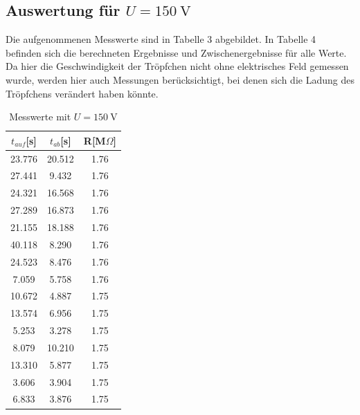 \documentclass[11pt,ngerman,a4paper]{article}
\begin{document}
\subsection{Auswertung für $U=\SI{150}{\volt}$}
Die aufgenommenen Messwerte sind in Tabelle 3 abgebildet. In Tabelle 4 befinden sich die berechneten Ergebnisse und Zwischenergebnisse für alle Werte. Da hier die Geschwindigkeit der Tröpfchen nicht ohne elektrisches Feld gemessen wurde, werden hier auch Messungen berücksichtigt, bei denen sich die Ladung des Tröpfchens verändert haben könnte.

\begin{table}[H]
\centering
\begin{tabular}{ccc}
\toprule
{ $t_{auf}$[s]} &{ $t_{ab}$[s]} &{ R[M$\Omega$] }\\
\midrule
23.776 & 20.512 & 1.76\\
27.441 & 9.432 & 1.76\\
24.321 & 16.568 & 1.76\\
27.289 & 16.873 & 1.76\\
21.155 & 18.188 & 1.76\\
40.118 & 8.290 & 1.76\\
24.523 & 8.476 & 1.76\\
7.059 & 5.758 & 1.76\\
10.672 & 4.887 & 1.75\\
13.574 & 6.956 & 1.75\\
5.253 & 3.278 & 1.75\\
8.079 & 10.210 & 1.75\\
13.310 & 5.877 & 1.75\\
3.606 & 3.904 & 1.75\\
6.833 & 3.876 & 1.75\\
\bottomrule
\end{tabular}
\label{}
\caption{Messwerte mit $U=\SI{150}{\volt}$}
\end{table}
\end{document}
